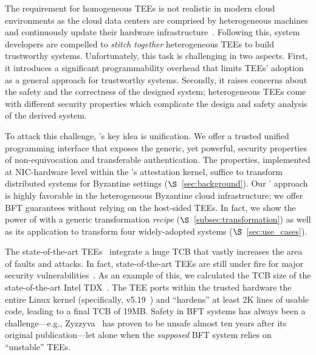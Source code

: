 The requirement for homogeneous TEEs is not realistic in modern cloud environments as the cloud data centers are comprised by heterogeneous machines and continuously update their hardware infrastructure~\cite{}. Following this, system developers are compelled to {\em stitch together} heterogeneous TEEs to build trustworthy systems. Unfortunately, this task is challenging in two aspects. First, it introduces a significant programmability overhead that limits TEEs' adoption as a general approach for trustworthy systems. Secondly, it raises concerns about the safety and the correctness of the designed system; heterogeneous TEEs come with different security properties which complicate the design and safety analysis of the derived system.


 To attack this challenge, \projecttitle{}'s key idea is unification. We offer a trusted unified programming interface that exposes the generic, yet powerful, security properties of non-equivocation and transferable authentication. The properties, implemented at NIC-hardware level within the \projecttitle{}'s attestation kernel, suffice to transform distributed systems for Byzantine settings ($\S$~\ref{sec:background}). Our \projecttitle{}' approach is highly favorable in the heterogeneous Byzantine cloud infrastructure; we offer BFT guarantees without relying on the host-sided TEEs. In fact, we show the power of \projecttitle{} with a generic transformation {\em recipe} ($\S$~\ref{subsec:transformation}) as well as its application to transform four widely-adopted systems ($\S$~\ref{sec:use_cases}).

 The state-of-the-art TEEs~\cite{amd-sev, intelTDX} integrate a huge TCB that vastly increases the area of faults and attacks. In fact, state-of-the-art TEEs are still under fire for major security vulnerabilities~\cite{intel_sgx_vulnerabilities1, intel_sgx_vulnerabilities2, intel_sgx_vulnerabilities3, intel_sgx_vulnerabilities4, intel_sgx_vulnerabilities5}. As an example of this, we calculated the TCB size of the state-of-the-art Intel TDX~\cite{intelTDX}. The TEE ports within the trusted hardware the entire Linux kernel (specifically, v5.19~\cite{linuxlifecircle}) and ``hardens'' at least 2K lines of usable code, leading to a final TCB of 19MB. Safety in BFT systems has always been a challenge---e.g., Zyzzyva~\cite{unsafe_Zyzzyva} has proven to be unsafe almost ten years after its original publication---let alone when the {\em supposed} BFT system relies on ``unstable'' TEEs. 

